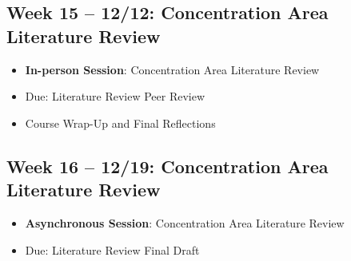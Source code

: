 \documentclass[12pt, letterpaper]{article}
\begin{document}
\subsection*{Week 15 -- 12/12: Concentration Area Literature Review}
\begin{itemize}
    \item \textbf{In-person Session}: Concentration Area Literature Review
    \item Due: Literature Review Peer Review
    \item Course Wrap-Up and Final Reflections
\end{itemize}

\subsection*{Week 16 -- 12/19: Concentration Area Literature Review}
\begin{itemize}
    \item \textbf{Asynchronous Session}: Concentration Area Literature Review
    \item Due: Literature Review Final Draft
\end{itemize}


            \singlespace
            
            
            
\end{document}
